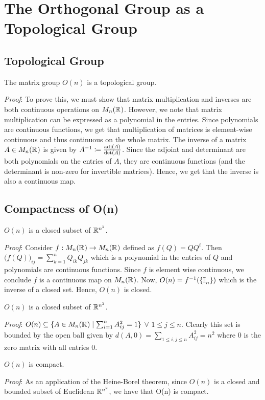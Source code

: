 \section{The Orthogonal Group as a Topological Group}
\label{s:results}
\subsection{Topological Group}
\begin{theorem}
 The matrix group $O(n)$ is a topological group.
\end{theorem}
\emph{Proof}: To prove this, we must show that matrix multiplication and inverses are both continuous operations on $M_n(\R)$. However, we note that matrix multiplication can be expressed as a polynomial in the entries. Since polynomials are continuous functions, we get that multiplication of matrices is element-wise continuous and thus continuous on the whole matrix. The inverse of a matrix $A \in M_n(\R)$ is given by $A^{-1} \Let \frac{\mathrm{adj}(A)}{\mathrm{det}(A)}$. Since the adjoint and determinant are both polynomials on the entries of $A$, they are continuous functions (and the determinant is non-zero for invertible matrices). Hence, we get that the inverse is also a continuous map.

\subsection{Compactness of O(n)}
\begin{lemma}
$O(n)$ is a closed subset of $\R[n^2]$.
\end{lemma}
\emph{Proof}: Consider $f: M_n(\R) \mapsto M_n(\R)$ defined as $f(Q) = QQ^{t}$. Then $\bigl(f(Q)\bigr)_{ij} = \sum_{k=1}^{n}Q_{ik}Q_{jk}$ which is a polynomial in the entries of $Q$ and polynomials are continuous functions. Since $f$ is element wise continuous, we conclude $f$ is a continuous map on $M_n(\R)$. Now, $O(n) = f^{-1}(\{\I_n\})$ which is the inverse of a closed set. Hence, $O(n)$ is closed.
\begin{lemma}
$O(n)$ is a closed subset of $\R[n^2]$.
\end{lemma}
\emph{Proof}: $O(n) \subseteq \{A \in M_n(\R) \suchthat \sum_{i=1}^{n} A_{ij}^{2} = 1\}$ $\forall$ $1 \leq j \leq n$. Clearly this set is bounded by the open ball given by $d(A, 0) = \sum_{1 \leq i,j \leq n}A_{ij}^{2} = n^2$ where $0$ is the zero matrix with all entries 0.

\begin{theorem}
$O(n)$ is compact.
\end{theorem}
\emph{Proof}: As an application of the Heine-Borel theorem, since $O(n)$ is a closed and bounded subset
of Euclidean $\R[n^2]$, we have that O(n) is compact.

